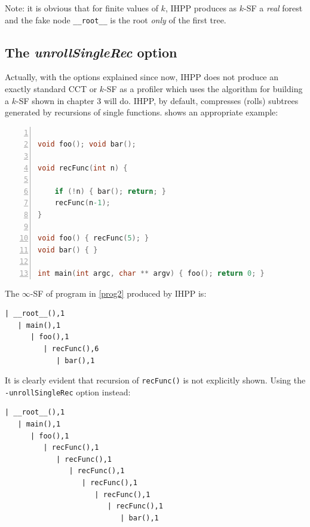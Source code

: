 \documentclass[a4paper,11pt]{report}
\begin{document}
\noindent
Note: it is obvious that for finite values of $k$, IHPP produces as $k$-SF 
a \emph{real} forest and the fake node \verb|__root__| is the root \emph{only} of the first tree.

\subsection{The \emph{unrollSingleRec} option}

Actually, with the options explained since now, IHPP does not produce an exactly standard
CCT or $k$-SF as a profiler which uses the algorithm for building a $k$-SF shown in chapter 3 will do. IHPP, by default, compresses (rolls) subtrees generated by recursions of single functions.  shows an appropriate example:

\begin{lstlisting}[language=C, 
	caption={prog2.c, a simple program that uses recursion}, 
	label=prog2, frame=leftline, numbers=left]

void foo(); void bar();

void recFunc(int n) {

	if (!n) { bar(); return; }
	recFunc(n-1);
}

void foo() { recFunc(5); }
void bar() { }

int main(int argc, char ** argv) { foo(); return 0; }

\end{lstlisting}

\noindent
The $\infty$-SF of program in \cref{prog2} produced by IHPP is:

\begin{lstlisting}[label=out5, caption={an example of $k$-SF \emph{without} the \texttt{unrollSingleRec} option}, frame=bottomline]
| __root__(),1
   | main(),1
      | foo(),1
         | recFunc(),6
            | bar(),1
\end{lstlisting}

\noindent
It is clearly evident that recursion of \verb|recFunc()| is not explicitly shown.
Using the \verb|-unrollSingleRec| option instead:
\begin{lstlisting}[label=out6, caption={an example of $k$-SF \emph{with} the \texttt{unrollSingleRec} option}, frame=bottomline]
| __root__(),1
   | main(),1
      | foo(),1
         | recFunc(),1
            | recFunc(),1
               | recFunc(),1
                  | recFunc(),1
                     | recFunc(),1
                        | recFunc(),1
                           | bar(),1
\end{lstlisting}
\end{document}
